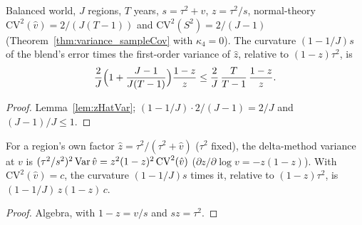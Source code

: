 \begin{theorem}\label{thm:bsPrice_balanced}
  \leanok
  Balanced world, $J$ regions, $T$ years, $s = \tau^2 + v$, $z = \tau^2/s$, normal-theory
  $\mathrm{CV}^2(\hat v) = 2/(J(T - 1))$ and $\mathrm{CV}^2(S^2) = 2/(J - 1)$
  (Theorem~\ref{thm:variance_sampleCov} with $\kappa_4 = 0$). The curvature $(1 - 1/J)s$ of the
  blend's error times the first-order variance of $\hat z$, relative to $(1 - z)\tau^2$, is
  \[ \frac2J\Bigl(1 + \frac{J - 1}{J(T - 1)}\Bigr)\frac{1 - z}{z} \le \frac2J\,\frac T{T - 1}\,\frac{1 - z}z. \]
\end{theorem}
\begin{proof}
  \leanok
  Lemma~\ref{lem:zHatVar}; $(1 - 1/J)\cdot 2/(J - 1) = 2/J$ and $(J - 1)/J \le 1$.
\end{proof}

\begin{lemma}\label{lem:ownPrice}
  \leanok
  For a region's own factor $\hat z = \tau^2/(\tau^2 + \hat v)$ ($\tau^2$ fixed), the delta-method
  variance at $v$ is $(\tau^2/s^2)^2\operatorname{Var}\hat v = z^2(1 - z)^2\,\mathrm{CV}^2(\hat v)$
  ($\partial z/\partial\log v = -z(1 - z)$). With $\mathrm{CV}^2(\hat v) = c$, the curvature
  $(1 - 1/J)s$ times it, relative to $(1 - z)\tau^2$, is $(1 - 1/J)\,z(1 - z)\,c$.
\end{lemma}
\begin{proof}
  \leanok
  Algebra, with $1 - z = v/s$ and $sz = \tau^2$.
\end{proof}

